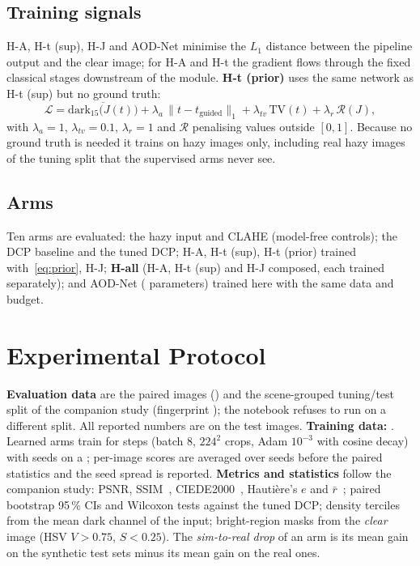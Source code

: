\documentclass[conference]{IEEEtran}
\begin{document}
\subsection{Training signals}
H-A, H-t (sup), H-J and AOD-Net minimise the $L_1$ distance between the pipeline output and the clear image; for H-A
and H-t the gradient flows through the fixed classical stages downstream of the module. \textbf{H-t (prior)} uses the
same network as H-t (sup) but no ground truth:
\begin{equation}
  \mathcal{L} = \overline{\mathrm{dark}_{15}\!\bigl(J(t)\bigr)} + \lambda_a\,\|t - t_{\text{guided}}\|_1
              + \lambda_{tv}\,\mathrm{TV}(t) + \lambda_r\,\mathcal{R}(J),
  \label{eq:prior}
\end{equation}
with $\lambda_a=1$, $\lambda_{tv}=0.1$, $\lambda_r=1$ and $\mathcal{R}$ penalising values outside $[0,1]$. Because
no ground truth is needed it trains on hazy images only, including \hybNRealHazy{} real hazy images of the tuning
split that the supervised arms never see.

\subsection{Arms}
Ten arms are evaluated: the hazy input and CLAHE (model-free controls); the DCP baseline and the tuned DCP; H-A,
H-t (sup), H-t (prior) trained with~\eqref{eq:prior}, H-J; \textbf{H-all} (H-A, H-t (sup) and H-J composed, each trained separately); and AOD-Net
(\hybAodParams{} parameters) trained here with the same data and budget.

\section{Experimental Protocol}
\textbf{Evaluation data} are the \nImages{} paired images (\dataSource) and the scene-grouped tuning/test split of the
companion study (fingerprint \texttt{\splitFingerprint}); the notebook refuses to run on a different split. All reported
numbers are on the \hybNTest{} test images. \textbf{Training data:} \hybTrainSource. Learned arms train for
\hybSteps{} steps (batch 8, $224^2$ crops, Adam $10^{-3}$ with cosine decay) with \hybSeeds{} seeds on a \hybDevice;
per-image scores are averaged over seeds before the paired statistics and the seed spread is reported.
\textbf{Metrics and statistics} follow the companion study: PSNR, SSIM~\cite{wang2004}, CIEDE2000~\cite{sharma2005},
Hautière's $e$ and $\bar r$~\cite{hautiere2008}; paired bootstrap 95\,\% CIs and Wilcoxon tests against the tuned DCP;
density terciles from the mean dark channel of the input; bright-region masks from the \emph{clear} image
(HSV $V>0.75$, $S<0.25$). The \emph{sim-to-real drop} of an arm is its mean gain on the synthetic test sets minus its
mean gain on the real ones.
\end{document}
